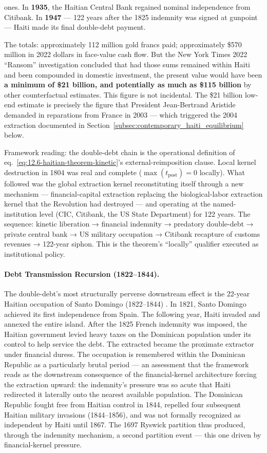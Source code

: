 ones. In \textbf{1935}, the Haitian Central Bank regained nominal independence from Citibank. In \textbf{1947} --- 122 years after the 1825 indemnity was signed at gunpoint --- Haiti made its final double-debt payment.

The totals: approximately 112 million gold francs paid; approximately \$570 million in 2022 dollars in face-value cash flow. But the New York Times 2022 ``Ransom'' investigation \cite{nyt_ransom2022,nyt_aristide_coup_2022} concluded that had those sums remained within Haiti and been compounded in domestic investment, the present value would have been \textbf{a minimum of \$21 billion, and potentially as much as \$115 billion} by other counterfactual estimates. This figure is not incidental. The \$21 billion low-end estimate is precisely the figure that President Jean-Bertrand Aristide demanded in reparations from France in 2003 --- which triggered the 2004 extraction documented in Section~\ref{subsec:contemporary_haiti_equilibrium} below.

Framework reading: the double-debt chain is the operational definition of eq.~\ref{eq:12.6-haitian-theorem-kinetic}'s external-reimposition clause. Local kernel destruction in 1804 was real and complete ($\max(t_{\text{post}}) = 0$ locally). What followed was the global extraction kernel reconstituting itself through a new mechanism --- financial-capital extraction replacing the biological-labor extraction kernel that the Revolution had destroyed --- and operating at the named-institution level (CIC, Citibank, the US State Department) for 122 years. The sequence: kinetic liberation → financial indemnity → predatory double-debt → private central bank → US military occupation → Citibank recapture of customs revenues → 122-year siphon. This is the theorem's ``locally'' qualifier executed as institutional policy.

\paragraph{Debt Transmission Recursion (1822--1844).}
The double-debt's most structurally perverse downstream effect is the 22-year Haitian occupation of Santo Domingo (1822--1844) \cite{moya_pons_dominican_republic}. In 1821, Santo Domingo achieved its first independence from Spain. The following year, Haiti invaded and annexed the entire island. After the 1825 French indemnity was imposed, the Haitian government levied heavy taxes on the Dominican population under its control to help service the debt. The extracted became the proximate extractor under financial duress. The occupation is remembered within the Dominican Republic as a particularly brutal period --- an assessment that the framework reads as the downstream consequence of the financial-kernel architecture forcing the extraction upward: the indemnity's pressure was so acute that Haiti redirected it laterally onto the nearest available population. The Dominican Republic fought free from Haitian control in 1844, repelled four subsequent Haitian military invasions (1844--1856), and was not formally recognized as independent by Haiti until 1867. The 1697 Ryswick partition thus produced, through the indemnity mechanism, a second partition event --- this one driven by financial-kernel pressure.

